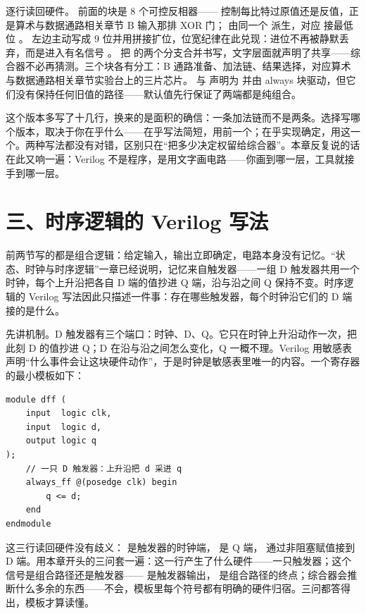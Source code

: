 逐行读回硬件。 前面的块是 8 个可控反相器—— 控制每比特过原值还是反值，正是算术与数据通路相关章节 B 输入那排 XOR 门； 由同一个  派生，对应  接最低位 。 左边主动写成 9 位并用拼接扩位，位宽纪律在此兑现：进位不再被静默丢弃，而是进入有名信号 。 把  的两个分支合并书写，文字层面就声明了共享——综合器不必再猜测。三个块各有分工：B 通路准备、加法链、结果选择，对应算术与数据通路相关章节实验台上的三片芯片。 与  声明为  并由 always 块驱动，但它们没有保持任何旧值的路径——默认值先行保证了两端都是纯组合。

这个版本多写了十几行，换来的是面积的确信：一条加法链而不是两条。选择写哪个版本，取决于你在乎什么——在乎写法简短，用前一个；在乎实现确定，用这一个。两种写法都没有对错，区别只在“把多少决定权留给综合器”。本章反复说的话在此又响一遍：Verilog 不是程序，是用文字画电路——你画到哪一层，工具就接手到哪一层。

\section{三、时序逻辑的 Verilog 写法}

前两节写的都是组合逻辑：给定输入，输出立即确定，电路本身没有记忆。“状态、时钟与时序逻辑”一章已经说明，记忆来自触发器——一组 D 触发器共用一个时钟，每个上升沿把各自 D 端的值抄进 Q 端，沿与沿之间 Q 保持不变。时序逻辑的 Verilog 写法因此只描述一件事：存在哪些触发器，每个时钟沿它们的 D 端接的是什么。


先讲机制。D 触发器有三个端口：时钟、D、Q。它只在时钟上升沿动作一次，把此刻 D 的值抄进 Q；D 在沿与沿之间怎么变化，Q 一概不理。Verilog 用敏感表声明“什么事件会让这块硬件动作”，于是时钟是敏感表里唯一的内容。一个寄存器的最小模板如下：

\begin{lstlisting}
module dff (
    input  logic clk,
    input  logic d,
    output logic q
);
    // 一只 D 触发器：上升沿把 d 采进 q
    always_ff @(posedge clk) begin
        q <= d;
    end
endmodule
\end{lstlisting}

这三行读回硬件没有歧义： 是触发器的时钟端， 是 Q 端， 通过非阻塞赋值接到 D 端。用本章开头的三问套一遍：这一行产生了什么硬件——一只触发器；这个信号是组合路径还是触发器—— 是触发器输出， 是组合路径的终点；综合器会推断什么多余的东西——不会，模板里每个符号都有明确的硬件归宿。三问都答得出，模板才算读懂。

